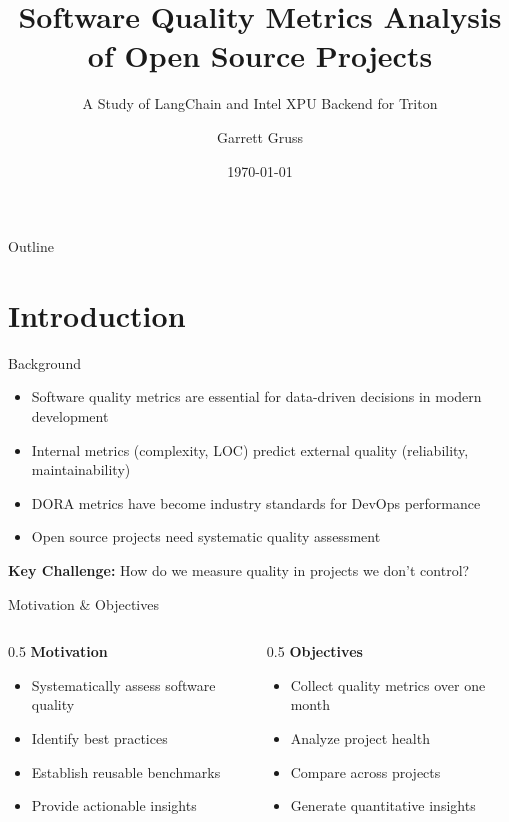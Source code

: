 \documentclass[aspectratio=169]{beamer}
\title{Software Quality Metrics Analysis of Open Source Projects}
\subtitle{A Study of LangChain and Intel XPU Backend for Triton}
\author{Garrett Gruss}
\institute{Southern Methodist University}
\date{\today}
\begin{document}
\begin{frame}
  \titlepage
\end{frame}

\begin{frame}{Outline}
  \tableofcontents
\end{frame}

\section{Introduction}

\begin{frame}{Background}
  \begin{itemize}
    \item Software quality metrics are essential for data-driven decisions in modern development
    \item Internal metrics (complexity, LOC) predict external quality (reliability, maintainability)
    \item DORA metrics have become industry standards for DevOps performance
    \item Open source projects need systematic quality assessment
  \end{itemize}

  \vspace{0.5cm}
  \textbf{Key Challenge:} How do we measure quality in projects we don't control?
\end{frame}

\begin{frame}{Motivation \& Objectives}
  \begin{columns}
    \begin{column}{0.5\textwidth}
      \textbf{Motivation}
      \begin{itemize}
        \item Systematically assess software quality
        \item Identify best practices
        \item Establish reusable benchmarks
        \item Provide actionable insights
      \end{itemize}
    \end{column}

    \begin{column}{0.5\textwidth}
      \textbf{Objectives}
      \begin{itemize}
        \item Collect quality metrics over one month
        \item Analyze project health
        \item Compare across projects
        \item Generate quantitative insights
      \end{itemize}
    \end{column}
  \end{columns}
\end{frame}
\end{document}
